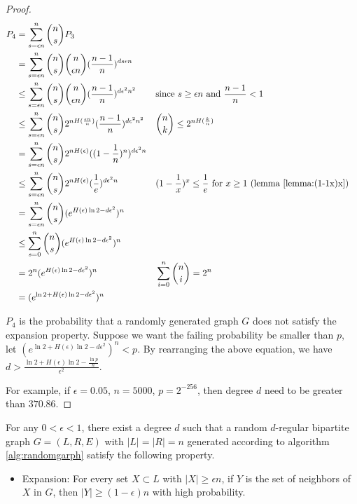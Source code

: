 \begin{proof}
\begin{align}
P_4 &= \sum_{s=\epsilon n}^{n} \binom{n}{s} P_3 \nonumber \\
    &= \sum_{s=\epsilon n}^{n} \binom{n}{s} \binom{n}{\epsilon n} (\frac{n-1}{n})^{d s \epsilon n} \nonumber \\
    &\le \sum_{s=\epsilon n}^{n} \binom{n}{s} \binom{n}{\epsilon n} (\frac{n-1}{n})^{d \epsilon^2 n^2} 
    && \text{since } s \ge \epsilon n \text{ and } \frac{n-1}{n} < 1 \nonumber \\
    &\le \sum_{s=\epsilon n}^{n} \binom{n}{s} 2^{n H(\frac{\epsilon n}{n})} (\frac{n-1}{n})^{d \epsilon^2 n^2} 
    && \binom{n}{k} \le 2^{n H(\frac{k}{n})} \nonumber \\
    &= \sum_{s=\epsilon n}^{n} \binom{n}{s} 2^{n H(\epsilon)} ((1 - \frac{1}{n})^{n})^{d \epsilon^2 n} \nonumber \\
    &\le \sum_{s=\epsilon n}^{n} \binom{n}{s} 2^{n H(\epsilon)} (\frac{1}{e})^{d \epsilon^2 n} 
    && (1 - \frac{1}{x})^x \le \frac{1}{e} \text{ for } x \ge 1 \text{ (lemma \ref{lemma:(1-1x)x})} \nonumber \\
    &= \sum_{s=\epsilon n}^{n} \binom{n}{s} (e^{ H(\epsilon) \ln 2  - d \epsilon^2})^n \nonumber \\
    &\le \sum_{s=0}^{n} \binom{n}{s} (e^{ H(\epsilon) \ln 2 - d \epsilon^2})^n \nonumber \\
    &= 2^n (e^{ H(\epsilon) \ln 2 - d \epsilon^2})^n 
    && \sum_{i=0}^n \binom{n}{i} = 2^n \nonumber \\
    &= (e^{\ln 2 + H(\epsilon) \ln 2 - d \epsilon^2})^n \nonumber \\
\end{align}

$P_4$ is the probability that a randomly generated graph $G$ does not satisfy the expansion property. Suppose we want the failing probability be smaller than $p$, let $(e^{\ln 2 + H(\epsilon) \ln 2 - d \epsilon^2})^n < p$.
By rearranging the above equation, we have $ d > \frac{\ln 2 + H(\epsilon) \ln 2 - \frac{\ln p}{n}}{\epsilon^2}$.

For example, if $\epsilon = 0.05$, $n = 5000$, $p = 2^{-256}$, then degree $d$ need to be greater than $370.86$.
\qedsymbol{}
\end{proof}


\begin{lemma}
\label{lemma:randomgraph2}

For any $0 < \epsilon < 1$, there exist a degree $d$ such that a random $d$-regular bipartite graph $G=(L, R, E)$ with $|L| = |R| = n$ generated according to algorithm \ref{alg:randomgarph} satisfy the following property.

    \begin{itemize}
        \item Expansion: For every set $X \subset L$ with $|X| \ge \epsilon n$, if $Y$ is the set of neighbors of $X$ in $G$, then $|Y| \ge (1 - \epsilon)  n$ with high probability.
    \end{itemize}

\end{lemma}


